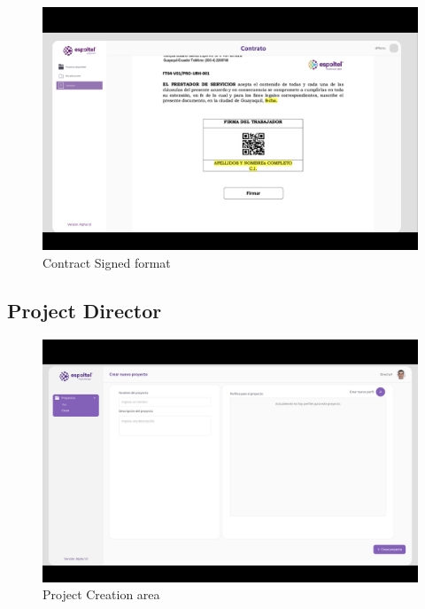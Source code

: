 \documentclass{scrreprt}
\begin{document}
\begin{figure}[H]
    
    \centering \small
    \includegraphics[width=1\textwidth]{WebPrototype/Projectsflow9.png}
    \caption{Contract Signed format}
\end{figure} 


\subsection{Project Director}
\begin{figure}[H]
    
    \centering \small
    \includegraphics[width=1\textwidth]{WebPrototype/Director_flow1.png}
    \caption{Project Creation area}
\end{figure} 
\end{document}
